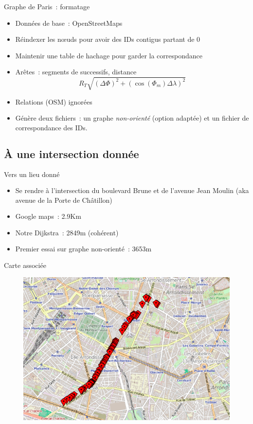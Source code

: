 \documentclass[11pt]{beamer}
\begin{document}
\begin{frame}{Graphe de Paris~: formatage}
\begin{itemize}
\item Données de base~: OpenStreetMaps
\item \alert{Réindexer} les n\oe uds pour avoir des IDs contigus partant de 0
\item Maintenir une table de hachage pour garder la correspondance
\item \alert{Arêtes}~: segments de  successifs, distance
\[ R_T \sqrt{\left(\Delta \Phi\right)^2 + \left(\cos\left(\Phi_m\right) \Delta \lambda\right)^2} \]
\item Relations (OSM) ignorées
\item Génère deux fichiers~: un graphe \emph{non-orienté} (option adaptée) et un fichier de correspondance des IDs.
\end{itemize}
\end{frame}

\subsection{À une intersection donnée}

\begin{frame}{Vers un lieu donné}
\begin{itemize}
\item Se rendre à l'intersection du \alert{boulevard Brune} et de l'\alert{avenue Jean Moulin} (aka avenue de la Porte de Châtillon)
\item Google maps~: 2.9Km
\item Notre Dijkstra~: 2849m (cohérent)
\item Premier essai sur graphe non-orienté~: 3653m
\end{itemize}
\end{frame}

\begin{frame}{Carte associée}
\begin{figure}
\includegraphics[width=0.9\linewidth]{map1.png}
\end{figure}
\end{frame}
\end{document}
